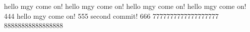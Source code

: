 hello mgy  come on!
hello mgy  come on!
hello mgy  come on!
hello mgy  come on! 444
hello mgy  come on! 555
second commit!  666
7777777777777777777
88888888888888888
